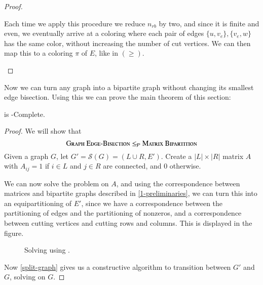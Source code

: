 \begin{proof}
\begin{enumerate}
					Each time we apply this procedure we reduce $n_{rb}$ by
					two, and since it is finite and even, we eventually arrive
					at a coloring where each pair of edges $\{u, v_e\},
					\{v_e, w\}$ has the same color, without increasing the
					number of cut vertices. We can then map this to
					a coloring $\pi$ of $E$, like in $(\geq)$.
		\end{enumerate}
	\end{proof}

	Now we can turn any graph into a bipartite graph without changing its
	smallest edge bisection. Using this we can prove the main theorem of this
	section:

	\begin{theorem}
		\label{main-thm}
		\mbpt is \NP-Complete.
	\end{theorem}
	\begin{proof}
		We will show that $$\textsc{Graph \allowbreak Edge-\allowbreak Bisection} \leq_{\mathcal{P}} \textsc{Matrix \allowbreak Bipartition}$$ Given a graph $G$,
		let $G'=\mathcal{S}(G)=(L\cup R, E')$. Create a $|L| \times |R|$ matrix
		$A$ with $A_{ij} = 1$ if $i \in L$ and $j \in R$ are connected, and $0$
		otherwise.

		We can now solve the \mbpt problem on $A$, and using the correspondence
		between matrices and bipartite graphs described in
		\autoref{1-preliminaries}, we can turn this into an equipartitioning of
		$E'$, since we have a correspondence between the partitioning of edges
		and the partitioning of nonzeros, and a correspondence between cutting
		vertices and cutting rows and columns. This is displayed in the figure.

		\begin{figure*}
			
			\centering
			\label{figmgeb}
			\caption{Solving \geb using \mbpt.}
		\end{figure*}

		Now \autoref{split-graph} gives us a constructive algorithm to
		transition between $G'$ and $G$, solving \geb on $G$.
	\end{proof}

